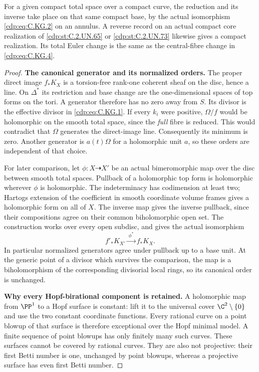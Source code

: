 \begin{proposition}
For a given compact total space over a compact curve,
the reduction and its inverse take place on that same
compact base, by the actual isomorphism \eqref{cdp:eq:C.KG.2} on an
annulus. A reverse record on an actual compact core
realization of \ref{cdp:st:C.2.UN.65} or \ref{cdp:st:C.2.UN.73} likewise gives a compact
realization. Its total Euler change is the same as
the central-fibre change in \eqref{cdp:eq:C.KG.4}.
\end{proposition}

\begin{proof}
\par\medskip\noindent\textbf{The canonical generator and its normalized orders.}
The proper direct image $f_*K_X$ is a torsion-free
rank-one coherent sheaf on the disc, hence a line.
On $\Delta^*$ its restriction and base change are the
one-dimensional spaces of top forms on the tori.
A generator therefore has no zero away from $S$.
Its divisor is the effective divisor in \eqref{cdp:eq:C.KG.1}.
If every $k_i$ were positive, $\Omega/f$ would be
holomorphic on the smooth total space, since the
\emph{full} fibre is reduced. This would contradict
that $\Omega$ generates the direct-image line.
Consequently its minimum is zero. Another generator
is $a(t)\Omega$ for a holomorphic unit $a$, so these
orders are independent of that choice.

For later comparison, let $\phi:X\dashrightarrow X'$
be an actual bimeromorphic map over the disc between
smooth total spaces. Pullback of a holomorphic top
form is holomorphic wherever $\phi$ is holomorphic.
The indeterminacy has codimension at least two;
Hartogs extension of the coefficient in smooth
coordinate volume frames gives a holomorphic form
on all of $X$. The inverse map gives the inverse
pullback, since their compositions agree on their
common biholomorphic open set. The construction
works over every open subdisc, and gives the actual
isomorphism
\[
                f'_*K_{X'}\xrightarrow{\ \phi^*\ } f_*K_X.
\tag{C.KG.6}\label{cdp:eq:C.KG.6}
\]
In particular normalized generators agree under
pullback up to a base unit. At the generic point
of a divisor which survives the comparison,
the map is a biholomorphism of the corresponding
divisorial local rings, so its canonical order is
unchanged.

\par\medskip\noindent\textbf{Why every Hopf-birational component is retained.}
A holomorphic map from $\PP^1$ to a Hopf surface
is constant: lift it to the universal cover
$\C^2\setminus\{0\}$ and use the two constant
coordinate functions. Every rational curve on
a point blowup of that surface is therefore
exceptional over the Hopf minimal model. A finite
sequence of point blowups has only finitely many
such curves. These surfaces cannot be covered by
rational curves. They are also not projective:
their first Betti number is one, unchanged by
point blowups, whereas a projective surface has
even first Betti number.


\end{proof}
